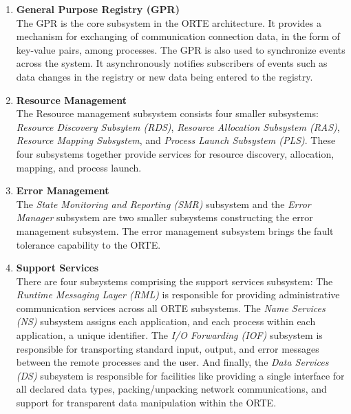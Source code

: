 \begin{enumerate}
\item \textbf{General Purpose Registry (GPR)}\\
  The GPR is the core subsystem in the ORTE architecture. It provides a mechanism for exchanging of communication connection data, in the form of key-value pairs, among processes.  The GPR is also used to synchronize events across the system. It asynchronously notifies subscribers of events such as data changes in the registry or new data being entered to the registry.
\item \textbf{Resource Management}\\
  The Resource management subsystem consists four smaller subsystems: \textit{Resource Discovery Subsytem (RDS)}, \textit{Resource Allocation Subsystem (RAS)}, \textit{Resource Mapping Subsystem}, and \textit{Process Launch Subsystem (PLS)}. These four subsystems together provide services for resource discovery, allocation, mapping, and process launch. 
\item \textbf{Error Management}\\
  The \textit{State Monitoring and Reporting (SMR)} subsystem and the \textit{Error Manager} subsystem are two smaller subsystems constructing the error management subsystem. The error management subsystem brings the fault tolerance capability to the ORTE.
\item \textbf{Support Services}\\
  There are four subsystems comprising the support services subsystem: The \textit{Runtime Messaging Layer (RML)} is responsible for providing administrative communication services across all ORTE subsystems. The \textit{Name Services (NS)} subsystem assigns each application, and each process within each application, a unique identifier. The \textit{I/O Forwarding (IOF)} subsystem is responsible for transporting standard input, output, and error messages between the remote processes and the user. And finally, the \textit{Data Services (DS)} subsystem is responsible for facilities like providing a single interface for all declared data types, packing/unpacking network communications, and support for transparent data manipulation within the ORTE.
\end{enumerate}

